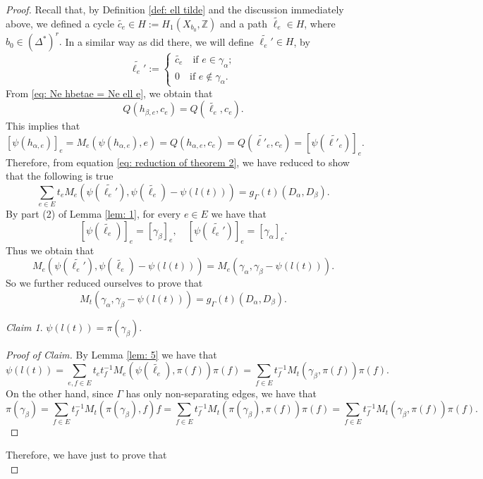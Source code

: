 \documentclass[a4paper,12 pt,titlepage,twoside]{book}
\newcommand{\numberset}{\mathbb}
\newcommand{\Z}{\numberset{Z}}
\theoremstyle{plain}
\theoremstyle{theorem}
\theoremstyle{definition}
\theoremstyle{remark}
\newtheorem*{claim*}{Claim}
\begin{document}
\begin{proof}
		Recall that, by Definition \ref{def: ell tilde} and the discussion immediately above, we defined a cycle $\widetilde{c_e} \in H:= H_1(X_{b_0},\Z)$ and a path $\widetilde{\ell_e} \in H$, where $b_0 \in (\Delta^*)^r.$ In a similar way as did there, we will define $\widetilde{\ell_e'} \in H$, by $$\widetilde{\ell_e'} := \begin{cases}
		\widetilde{c_e} \quad \text{if } e \in \gamma_\alpha;\\ 0 \quad \text{if } e \notin \gamma_\alpha.
		\end{cases}$$ 
		From \eqref{eq: Ne hbetae = Ne ell e}, we obtain that $$Q(h_{\beta,e},c_e) = Q(\widetilde{\ell_e},c_e).$$ This implies that $$[\psi(h_{\alpha,e})]_e = M_e(\psi(h_{\alpha,e}),e) = Q(h_{\alpha,e},c_e) = Q(\widetilde{\ell'_e},c_e) = [\psi(\widetilde{\ell'_e})]_e.$$ Therefore, from equation \eqref{eq: reduction of theorem 2}, we have reduced to show that the following is true \begin{equation}\label{eq: reduction of theorem 3}
		\sum_{e \in E} t_e M_e(\psi(\widetilde{\ell_e'}), \psi(\widetilde{\ell_e})- \psi(l(t))) = g_\Gamma(t)(D_\alpha, D_\beta).
		\end{equation} 
		By part (2) of Lemma \ref{lem: 1}, for every $e\in E$ we have that $$[\psi(\widetilde{\ell_e})]_e = [\gamma_\beta]_e, \quad [\psi(\widetilde{\ell_e'})]_e =[\gamma_\alpha]_e.$$ Thus we obtain that $$M_e(\psi(\widetilde{\ell_e'}), \psi(\widetilde{\ell_e})-\psi(l(t))) = M_e(\gamma_\alpha, \gamma_\beta - \psi(l(t))).$$ So we further reduced ourselves to prove that 
		\begin{equation}
		M_t(\gamma_\alpha, \gamma_\beta - \psi(l(t))) = g_\Gamma(t)(D_\alpha, D_\beta).
		\end{equation}
		\begin{claim*}%
			$\psi(l(t)) = \pi(\gamma_\beta).$
		\end{claim*}
		\begin{proof}[Proof of Claim]
			By Lemma \ref{lem: 5} we have that $$\psi(l(t)) = \sum_{e,f \in E} t_e t_f^{-1} M_e(\psi(\widetilde{\ell_e}), \pi(f))\pi(f) = \sum_{f \in E} t_f^{-1} M_t(\gamma_\beta, \pi(f)) \pi(f).$$ On the other hand, since $\Gamma$ has only non-separating edges, we have that  $$\pi(\gamma_\beta) = \sum_{f \in E} t_f^{-1} M_t(\pi(\gamma_\beta), f) f = \sum_{f \in E} t_f^{-1} M_t(\pi(\gamma_\beta),\pi(f))\pi(f) = \sum_{f \in E} t_f^{-1} M_t(\gamma_\beta, \pi(f))\pi(f).$$
		\end{proof}
		Therefore, we have just to prove that \begin{equation}

\end{equation}
\end{proof}
\end{document}
